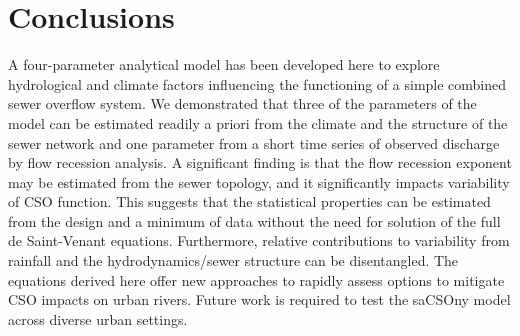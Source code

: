 \documentclass{agujournal2018}
\begin{document}
\section{Conclusions}
A four-parameter analytical model has been developed here to explore hydrological and climate factors inf\/luencing the functioning of a simple combined sewer overf\/low system. We demonstrated that three of the parameters of the model can be estimated readily a priori from the climate and the structure of the sewer network and one parameter from a short time series of observed discharge by f\/low recession analysis. A signif\/icant f\/inding is that the f\/low recession exponent may be estimated from the sewer topology, and it signif\/icantly impacts variability of CSO function. This suggests that the statistical properties can be estimated from the design and a minimum of data without the need for solution of the full de Saint-Venant equations. Furthermore, relative contributions to variability from rainfall and the hydrodynamics/sewer structure can be disentangled. The equations derived here of\/fer new approaches to  rapidly assess options to mitigate CSO impacts on urban rivers. Future work is required to test the saCSOny model across diverse urban settings.


%
%
%
%
%
%

 


  

 
 
 
 
 
%
 

%
%
\end{document}
